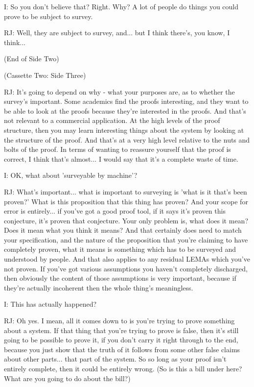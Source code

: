 \documentclass[10pt,titlepage]{book}
\begin{document}
I: So you don't believe that? Right. Why? A lot of people do things you could prove to be subject to survey.

RJ: Well, they are subject to survey, and... but I think there's, you know, I think...

(End of Side Two)

(Cassette Two: Side Three)

RJ: It's going to depend on why - what your purposes are, as to whether the survey's important. Some academics find the proofs interesting, and they want to be able to look at the proofs because they're interested in the proofs. And that's not relevant to a commercial application. At the high levels of the proof structure, then you may  learn interesting things about the system by looking at the structure of the proof. And that's at a very high level relative to the nuts and bolts of the proof. In terms of wanting to reassure yourself that the proof is correct, I think that's almost... I would say that it's a complete waste of time.

I: OK, what about 'surveyable by machine'?

RJ: What's important... what is important to surveying is 'what is it that's been proven?' What is this proposition that this thing has proven? And your scope for error is entirely... if you've got a good proof tool, if it says it's proven this conjecture, it's proven that conjecture. Your only problem is, what does it mean? Does it mean what you think it means? And that certainly does need to match your specification, and the nature of the proposition that you're claiming to have completely proven, what it means is something which has to be surveyed and understood by people. And that also applies to any residual LEMAs which you've not proven. If you've got various assumptions you haven't completely discharged, then obviously the content of those assumptions is very important, because if they're actually incoherent then the whole thing's meaningless.

I: This has actually happened?

RJ: Oh yes. I mean, all it comes down to is you're trying to prove something about a system. If that thing that you're trying to prove is false, then it's still going to be possible to prove it, if you don't carry it right through to the end, because you just show that the truth of it follows from some other false claims about other parts... that part of the system. So so long as your proof isn't entirely complete, then it could be entirely wrong. (So is this a bill under here? What are you going to do about the bill?)
\end{document}
